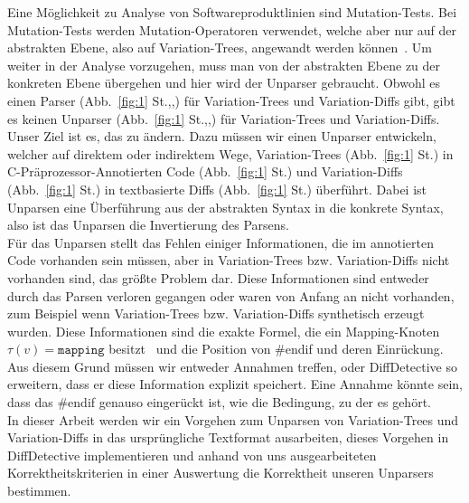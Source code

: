 Eine Möglichkeit zu Analyse von Softwareproduktlinien sind Mutation-Tests. Bei Mutation-Tests werden Mutation-Operatoren verwendet, welche aber nur auf der abstrakten Ebene, also auf Variation-Trees, angewandt werden können~\cite{ABT+:VaMoS16}. Um weiter in der Analyse vorzugehen, muss man von der abstrakten Ebene zu der konkreten Ebene übergehen und hier wird der Unparser gebraucht. Obwohl es einen Parser (Abb.~\ref{fig:1} St.,,) für Variation-Trees und Variation-Diffs gibt, gibt es keinen Unparser (Abb.~\ref{fig:1} St.,,) für Variation-Trees und Variation-Diffs. Unser Ziel ist es, das zu ändern. Dazu müssen wir einen Unparser entwickeln, welcher auf direktem oder indirektem Wege, Variation-Trees (Abb.~\ref{fig:1} St.) in C-Präprozessor-Annotierten Code (Abb.~\ref{fig:1} St.) und Variation-Diffs (Abb.~\ref{fig:1} St.) in textbasierte Diffs (Abb.~\ref{fig:1} St.) überführt. Dabei ist Unparsen eine Überführung aus der abstrakten Syntax in die konkrete Syntax, also ist das Unparsen die Invertierung des Parsens. \\




 

Für das Unparsen stellt das Fehlen einiger Informationen, die im annotierten Code vorhanden sein müssen, aber in Variation-Trees bzw. Variation-Diffs nicht vorhanden sind, das größte Problem dar. Diese Informationen sind entweder durch das Parsen verloren gegangen oder waren von Anfang an nicht vorhanden, zum Beispiel wenn Variation-Trees bzw. Variation-Diffs synthetisch erzeugt wurden. Diese Informationen sind die exakte Formel, die ein Mapping-Knoten $\tau(v) = \texttt{mapping}$ besitzt~\cite{BTS+:ESECFSE22} und die Position von \#endif und deren Einrückung. Aus diesem Grund müssen wir entweder Annahmen treffen, oder DiffDetective so erweitern, dass er diese Information explizit speichert. Eine Annahme könnte sein, dass das \#endif genauso eingerückt ist, wie die Bedingung, zu der es gehört.\\

In dieser Arbeit werden wir ein Vorgehen zum Unparsen von Variation-Trees und Variation-Diffs in das ursprüngliche Textformat ausarbeiten, dieses Vorgehen in DiffDetective implementieren und anhand von uns ausgearbeiteten Korrektheitskriterien in einer Auswertung die Korrektheit unseren Unparsers bestimmen.\\

